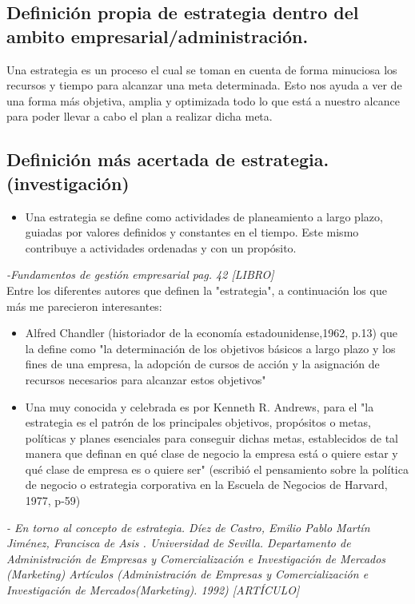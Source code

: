 \documentclass[letterpaper,12pt]{article}
\begin{document}
\begin{sloppypar}
\subsection*{Definición propia de estrategia dentro del ambito empresarial/administración. }
Una estrategia es un proceso el cual se toman en cuenta de forma minuciosa los recursos y tiempo para alcanzar una meta determinada. Esto nos ayuda a ver de una forma más objetiva, amplia y optimizada todo lo que está a nuestro alcance para poder llevar a cabo el plan a realizar dicha meta. 

\subsection*{Definición más acertada de estrategia. (investigación)}
\begin{itemize}
    \item Una estrategia se define como actividades de planeamiento a largo plazo, guiadas por valores definidos y constantes en el
    tiempo. Este mismo contribuye a actividades ordenadas y con un propósito.
\end{itemize}
\textit{-Fundamentos de gestión empresarial pag. 42 [LIBRO]}
\vspace{0.3cm}\\
Entre los diferentes autores que definen la "estrategia", a continuación los que más me parecieron interesantes:
   \begin{itemize}
    \item Alfred Chandler (historiador de la economía estadounidense,1962, p.13) que la define como "la determinación de los objetivos básicos a largo plazo y los fines de una empresa, la adopción de cursos de acción y la asignación de recursos necesarios para alcanzar estos objetivos"
    \item Una muy conocida y celebrada es por Kenneth R. Andrews, para el "la estrategia es el patrón de los principales objetivos, propósitos o metas, políticas y planes esenciales para conseguir dichas metas, establecidos de tal manera que definan en qué clase de negocio la empresa está o quiere estar y qué clase de empresa es o quiere ser"  (escribió el pensamiento sobre la política de negocio o estrategia corporativa en la Escuela de Negocios de Harvard, 1977, p-59)
   \end{itemize}
\textit{ - En torno al concepto de estrategia. Díez de Castro, Emilio Pablo Martín Jiménez, Francisca de Asis . Universidad de Sevilla. Departamento de Administración de Empresas y Comercialización e Investigación de Mercados (Marketing)
Artículos (Administración de Empresas y Comercialización e Investigación de Mercados(Marketing). 1992) [ARTÍCULO]}


\end{sloppypar}
\end{document}
